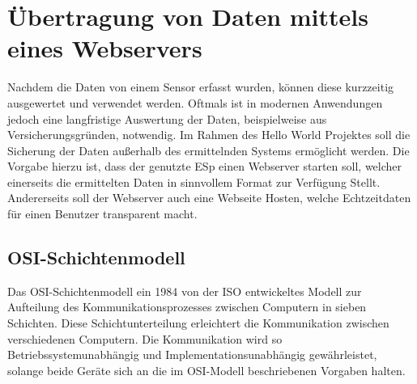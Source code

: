 
\section{Übertragung von Daten mittels eines Webservers}
Nachdem die Daten von einem Sensor erfasst wurden, können diese kurzzeitig ausgewertet und verwendet werden. Oftmals ist in modernen Anwendungen jedoch eine langfristige Auswertung der Daten, beispielweise aus Versicherungsgründen, notwendig. Im Rahmen des Hello World Projektes soll die Sicherung der Daten außerhalb des ermittelnden Systems ermöglicht werden. Die Vorgabe hierzu ist, dass der genutzte ESp einen Webserver starten soll, welcher einerseits die ermittelten Daten in sinnvollem Format zur Verfügung Stellt. Andererseits soll der Webserver auch eine Webseite Hosten, welche Echtzeitdaten für einen Benutzer transparent macht.

\subsection{OSI-Schichtenmodell}
Das \ac{OSI}-Schichtenmodell ein 1984 von der  \ac{ISO} entwickeltes Modell zur Aufteilung des Kommunikationsprozesses zwischen Computern in sieben Schichten. Diese Schichtunterteilung erleichtert die Kommunikation zwischen verschiedenen Computern. Die Kommunikation wird so Betriebssystemunabhängig und Implementationsunabhängig gewährleistet, solange beide Geräte sich an die im \ac{OSI}-Modell beschriebenen Vorgaben halten.

